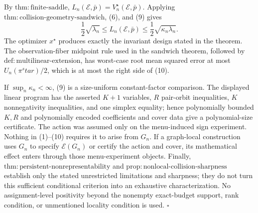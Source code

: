 By \(\mathrm{thm{:}finite\text{-}saddle}\), \(L_n(\mathcal E,\bar p)=V_n^\star(\mathcal E,\bar p)\). Applying \(\mathrm{thm{:}collision\text{-}geometry\text{-}sandwich}\), (6), and (9) gives
\[
 \frac12\sqrt{\lambda_n}
 \le L_n(\mathcal E,\bar p)
 \le\frac12\sqrt{\kappa_n\lambda_n}. \tag{10}
\]
The optimizer \(x^\star\) produces exactly the invariant design stated in the theorem. The observation-fiber midpoint rule used in the sandwich theorem, followed by \(\mathrm{def{:}multilinear\text{-}extension}\), has worst-case root mean squared error at most \(U_n(\pi^star)/2\), which is at most the right side of (10).

If \(\sup_n\kappa_n<\infty\), (9) is a size-uniform constant-factor comparison. The displayed linear program has the asserted \(K+1\) variables, \(R\) pair-orbit inequalities, \(K\) nonnegativity inequalities, and one simplex equality; hence polynomially bounded \(K,R\) and polynomially encoded coefficients and cover data give a polynomial-size certificate. The action was assumed only on the menu-induced sign experiment. Nothing in (1)--(10) requires it to arise from \(G_n\). If a graph-local construction uses \(G_n\) to specify \(\mathcal E(G_n)\) or certify the action and cover, its mathematical effect enters through those menu-experiment objects. Finally, \(\mathrm{thm{:}persistent\text{-}nonrepresentability}\) and \(\mathrm{prop{:}nonlocal\text{-}collision\text{-}sharpness}\) establish only the stated unrestricted limitations and sharpness; they do not turn this sufficient conditional criterion into an exhaustive characterization. No assignment-level positivity beyond the nonempty exact-budget support, rank condition, or unmentioned locality condition is used. \(\square\)